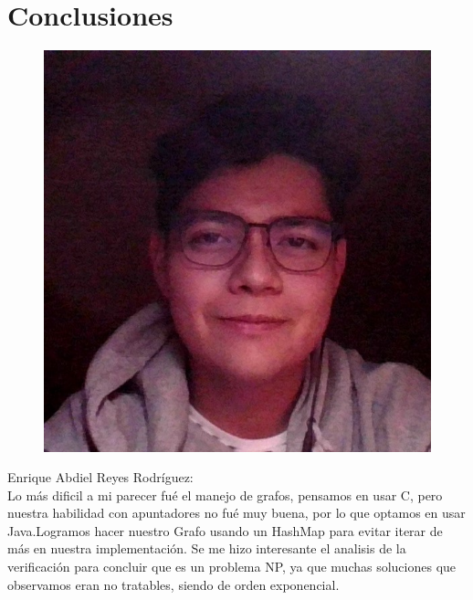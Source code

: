 \documentclass{article}
\begin{document}
        
        
    
\newpage
\section{Conclusiones}
    \begin{figure}
        \centering
        \includegraphics[scale=0.2]{abdiel.png}
    \end{figure}
    Enrique Abdiel Reyes Rodríguez:\\
    Lo más dificil a mi parecer fué el manejo de grafos, pensamos en usar C, pero nuestra habilidad con apuntadores no fué muy buena, por lo que optamos en usar Java.Logramos hacer nuestro Grafo usando un HashMap para evitar iterar de más en nuestra implementación. Se me hizo interesante el analisis de la verificación para concluir que es un problema NP, ya que muchas soluciones que observamos eran no tratables, siendo de orden exponencial.\\
    
\end{document}

